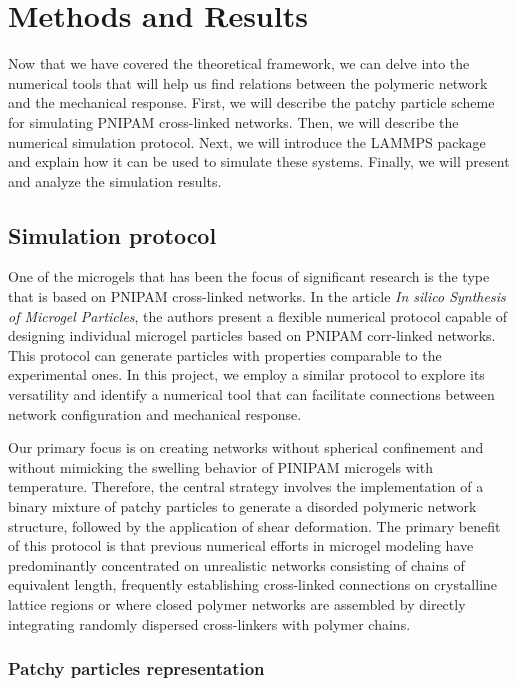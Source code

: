 \chapter{Methods and Results}

Now that we have covered the theoretical framework, we can delve into the numerical tools that will help us find relations between the polymeric network and the mechanical response.
First, we will describe the patchy particle scheme for simulating PNIPAM cross-linked networks.
Then, we will describe the numerical simulation protocol.
Next, we will introduce the LAMMPS package and explain how it can be used to simulate these systems.
Finally, we will present and analyze the simulation results.

\section{Simulation protocol}

One of the microgels that has been the focus of significant research is the type that is based on PNIPAM cross-linked networks.
In the article \textit{In silico Synthesis of Microgel Particles}\citep{gnanSilicoSynthesisMicrogel2017}, the authors present a flexible numerical protocol capable of designing individual microgel particles based on PNIPAM corr-linked networks. 
This protocol can generate particles with properties comparable to the experimental ones.
In this project, we employ a similar protocol to explore its versatility and identify a numerical tool that can facilitate connections between network configuration and mechanical response.

Our primary focus is on creating networks without spherical confinement and without mimicking the swelling behavior of PINIPAM microgels with temperature.
Therefore, the central strategy involves the implementation of a binary mixture of patchy particles to generate a disorded polymeric network structure, followed by the application of shear deformation.
The primary benefit of this protocol is that previous numerical efforts in microgel modeling have predominantly concentrated on unrealistic networks consisting of chains of equivalent length, frequently establishing cross-linked connections on crystalline lattice regions or where closed polymer networks are assembled by directly integrating randomly dispersed cross-linkers with polymer chains.

\subsection{Patchy particles representation}

